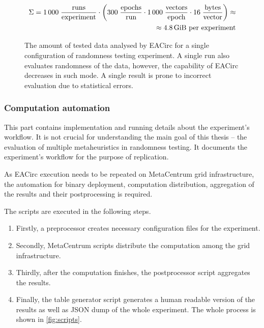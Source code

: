 \documentclass[
    digital,    %
    oneside,    %
    color,
    11pt,
    nocover,
    notable,
    nolof,
    nolot,
]{fithesis3}
\begin{document}
\begin{figure}[t]
    \begin{equation*}
        \begin{aligned}
    \Sigma = 1\,000 \;
             \frac{\textnormal{runs}}
                  {\textnormal{experiment}}
             \cdot
             \left(
             300 \;
             \frac{\textnormal{epochs}}
                  {\textnormal{run}}
             \cdot
             1\,000 \;
             \frac{\textnormal{vectors}}
                  {\textnormal{epoch}}
             \cdot
             16 \;
             \frac{\textnormal{bytes}}
                  {\textnormal{vector}}
             \right) \approx\\
             \approx 4.8 \textnormal{\,GiB per experiment}
        \end{aligned}
    \end{equation*}
    \caption{The amount of tested data analysed by EACirc for a single configuration of randomness testing experiment. A single run also evaluates randomness of the data, however, the capability of EACirc decreases in such mode. A single result is prone to incorrect evaluation due to statistical errors.}
    \label{fig:dataUsage}
\end{figure}


\subsubsection{\textbf{Computation automation}}
\label{subsubsec:method-spec-ss-auto}

This part contains implementation and running details about the experiment's workflow. It is not crucial for understanding the main goal of this thesis -- the evaluation of multiple metaheuristics in randomness testing. It documents the experiment's workflow for the purpose of replication.

As EACirc execution needs to be repeated on MetaCentrum grid infrastructure, the automation for binary deployment, computation distribution, aggregation of the results and their postprocessing is required.

The scripts are executed in the following steps.

\begin{enumerate}[noitemsep,topsep=3pt,parsep=3pt,partopsep=3pt]
 \item Firstly, a preprocessor creates necessary configuration files for the experiment.
 \item Secondly, MetaCentrum scripts distribute the computation among the grid infrastructure.
 \item Thirdly, after the computation finishes, the postprocessor script aggregates the results. 
 \item Finally, the table generator script generates a human readable version of the results as well as \textsc{JSON} dump of the whole experiment. The whole process is shown in \cref{fig:scripts}.
\end{enumerate}
\end{document}
